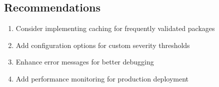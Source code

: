 \documentclass[11pt, a4paper]{article}
\begin{document}
\subsection{Recommendations}
\begin{enumerate}
    \item Consider implementing caching for frequently validated packages
    \item Add configuration options for custom severity thresholds
    \item Enhance error messages for better debugging
    \item Add performance monitoring for production deployment
\end{enumerate}
\end{document}
